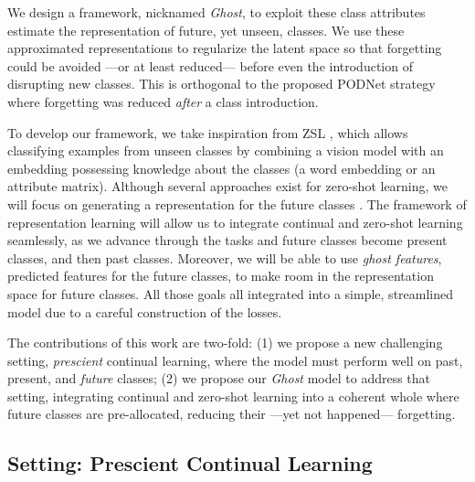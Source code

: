 We design a framework, nicknamed \textit{Ghost}, to exploit these class attributes estimate the
representation of future, yet unseen, classes. We use these approximated representations to
regularize the latent space so that forgetting could be avoided ---or at least reduced--- before
even the introduction of disrupting new classes. This is orthogonal to the proposed PODNet strategy
where forgetting was reduced \textit{after} a class introduction.

To develop our framework, we take inspiration from \acf{ZSL}
\citep{lampert2009zeroshot,xian2019awa2}, which allows classifying examples from unseen classes by
combining a vision model with an embedding possessing knowledge about the classes (\eg a word
embedding \citep{mikolov2013word2vec,pennington2014glove} or an attribute matrix). Although several
approaches exist for zero-shot learning, we will focus on generating a representation for the future
classes \citep{bucher2017zeroshot_gmmn, kumar2018synthesized_zeroshot,
    xian2018feature_generating_zeroshot}. The framework of representation learning will allow us to
integrate continual and zero-shot learning seamlessly, as we advance through the tasks and future
classes become present classes, and then past classes. Moreover, we will be able to use
\textit{ghost features}, predicted features for the future classes, to make room in the
representation space for future classes. All those goals all integrated into a simple, streamlined
model due to a careful construction of the losses.

The contributions of this work are two-fold: (1) we propose a new challenging setting,
\textit{prescient} continual learning, where the model must perform well on past, present, and
\textit{future} classes; (2) we propose our \textit{Ghost} model to address that setting,
integrating continual and zero-shot learning into a coherent whole where future classes are
pre-allocated, reducing their ---yet not happened--- forgetting.


\subsection{Setting: Prescient Continual Learning}
\label{sec:ghost_setting}

